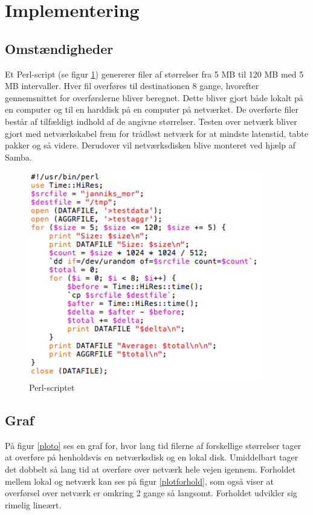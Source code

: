 \documentclass{article}
\begin{document}
\section{Implementering}

\subsection{Omstændigheder}

Et Perl-script (se figur \ref{kode}) genererer filer af størrelser fra 5 MB til 120 MB med 5 MB intervaller. Hver fil overføres til destinationen 8 gange, hvorefter gennemsnittet for overførslerne bliver beregnet. Dette bliver gjort både lokalt på en computer og til en harddisk på en computer på netværket. De overførte filer består af tilfældigt indhold af de angivne størrelser. Testen over netværk bliver gjort med netværkskabel frem for trådløst netværk for at mindste latenstid, tabte pakker og så videre. Derudover vil netværksdisken blive monteret ved hjælp af Samba.

\begin{figure}
	\includegraphics[width=4in]{kode.png}
	\caption{Perl-scriptet}
	\label{kode}
\end{figure}

\subsection{Graf}
På figur \ref{ploto} ses en graf for, hvor lang tid filerne af forskellige størrelser tager at overføre på henholdsvis en netværksdisk og en lokal disk. Umiddelbart tager det dobbelt så lang tid at overføre over netværk hele vejen igennem. Forholdet mellem lokal og netværk kan ses på figur \ref{plotforhold}, som også viser at overførsel over netværk er omkring 2 gange så langsomt. Forholdet udvikler sig rimelig lineært.
\end{document}
